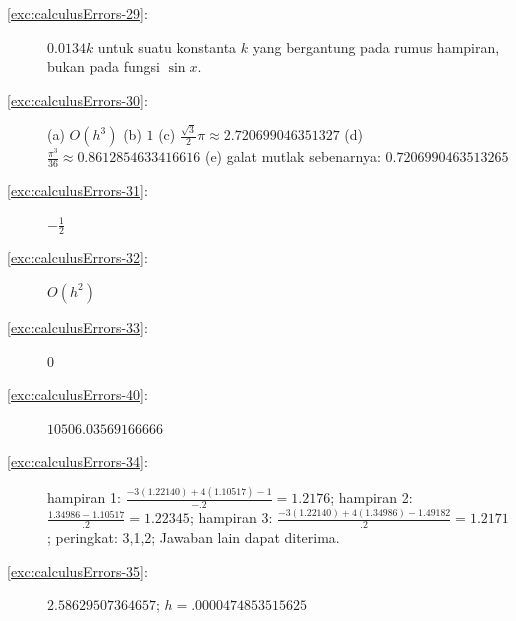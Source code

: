 \begin{description}
\item [{\ref{exc:calculusErrors-29}:}] $0.0134k$ untuk suatu konstanta
$k$ yang bergantung pada rumus hampiran, bukan pada fungsi $\sin x$.
\item [{\ref{exc:calculusErrors-30}:}] (a) $O(h^{3})$ (b) $1$ (c) $\frac{\sqrt{3}}{2}\pi\approx2.720699046351327$
(d) $\frac{\pi^{3}}{36}\approx0.8612854633416616$ (e) galat mutlak
sebenarnya: $0.7206990463513265$
\item [{\ref{exc:calculusErrors-31}:}] $-\frac{1}{2}$
\item [{\ref{exc:calculusErrors-32}:}] $O(h^{2})$
\item [{\ref{exc:calculusErrors-33}:}] $0$
\item [{\ref{exc:calculusErrors-40}:}] $10506.03569166666$
\item [{\ref{exc:calculusErrors-34}:}] hampiran 1: $\frac{-3(1.22140)+4(1.10517)-1}{-.2}=1.2176$;
hampiran 2: $\frac{1.34986-1.10517}{.2}=1.22345$; hampiran 3: $\frac{-3(1.22140)+4(1.34986)-1.49182}{.2}=1.2171$;
peringkat: 3,1,2; Jawaban lain dapat diterima.
\item [{\ref{exc:calculusErrors-35}:}] $2.58629507364657$; $h=.0000474853515625$
\end{description}

